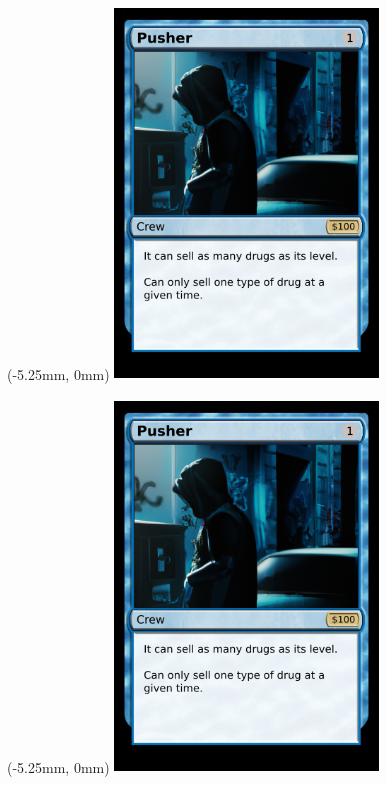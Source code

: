 \documentclass{article}
\begin{document}
	\begin{textblock*}{0mm}(-5.25mm, 0mm)
        \includegraphics[width=70mm, height=99mm]{../png/crew/pusher/pusher1.png}
    \end{textblock*}

	\begin{textblock*}{0mm}(-5.25mm, 0mm)
        \includegraphics[width=70mm, height=99mm]{../png/crew/pusher/pusher1.png}
    \end{textblock*}
\end{document}
